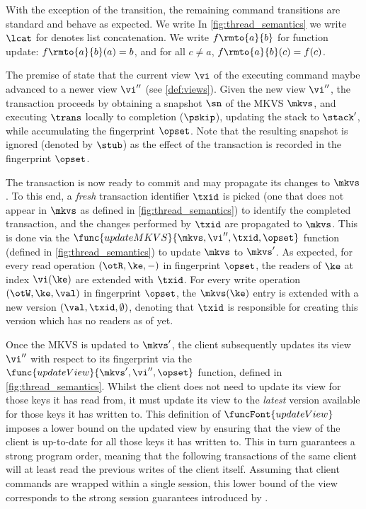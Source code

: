 With the exception of the  transition, the remaining command transitions are standard and behave as expected. We write 
In \cref{fig:thread_semantics} we write $\lcat$ for denotes list concatenation.
We write $f \rmto{a}{b}$ for function update: $f \rmto{a}{b}(a) = b$, and for all $c \ne a$, $f \rmto{a}{b}(c) = f(c)$.


The premise of  state that the current view $\vi$ of the executing command maybe advanced to a newer view $\vi''$ (see \cref{def:views}). 
Given the new view $\vi''$, the transaction proceeds by obtaining a snapshot $\sn$ of the MKVS $\mkvs$, and executing $\trans$ locally to completion ($\pskip$), updating the stack to $\stack'$, while accumulating the fingerprint $\opset$. Note that the resulting snapshot is ignored (denoted by $\stub$) as the effect of the transaction is recorded in the fingerprint $\opset$. 
%

The transaction is now ready to commit and may propagate its changes to $\mkvs$.
To this end, a \emph{fresh} transaction identifier $\txid$ is picked (\ie one that does not appear in $\mkvs$ as defined in \cref{fig:thread_semantics}) to identify the completed transaction, and the changes performed by $\txid$ are propagated to $\mkvs$. 
This is done via the $\func{updateMKVS}{\mkvs, \vi'', \txid, \opset}$ function (defined in \cref{fig:thread_semantics}) to update $\mkvs$ to  $\mkvs'$. 
As expected, for every read operation $(\otR, \ke, -)$ in fingerprint $\opset$, the readers of $\ke$ at index $\vi(\ke)$ are extended with $\txid$.
For every write operation $(\otW, \ke, \val)$ in fingerprint $\opset$, the $\mkvs(\ke)$ entry is extended with a new version $(\val, \txid, \emptyset)$, denoting that $\txid$ is responsible for creating this version which has no readers as of yet. 

Once the MKVS is updated to $\mkvs'$, the client subsequently updates its view $\vi''$ with respect to its fingerprint via the $\func{updateView}{\mkvs', \vi'', \opset}$ function, defined in \cref{fig:thread_semantics}.
Whilst the client does not need to update its view for those keys it has read from, 
it must update its view to the \emph{latest} version available for those keys it has written to. %
This definition of $\funcFont{updateView}$ imposes a lower bound on the updated view by ensuring that the view of the client is up-to-date for all those keys it has written to. 
This in turn guarantees a strong program order, meaning that the following transactions of the same client will at least read the previous writes of the client  itself.
Assuming that client commands are wrapped within a single session, this lower bound of the view corresponds to the strong session guarantees introduced by \cite{.........}.

